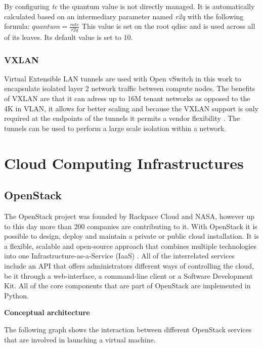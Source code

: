 By configuring \textit{tc} the quantum value is not directly managed. It is automatically calculated based on an intermediary parameter named \textit{r2q} with the following formula:  $ quantum = \frac{rate}{r2q} $ This value is set on the root qdisc and is used across all of its leaves. Its default value is set to 10.


\subsubsection{VXLAN}

Virtual Extensible LAN tunnels are used with Open vSwitch in this work to encapsulate isolated layer 2 network traffic between compute nodes. The benefits of VXLAN are that it can adress up to 16M tenant networks as opposed to the 4K in VLAN, it allows for better scaling and because the VXLAN support is only required at the endpoints of the tunnels it permits a vendor flexibility \cite{openstack-vxlan}. The tunnels can be used to perform a large scale isolation within a network.

\newpage
\section{Cloud Computing Infrastructures}


\subsection{OpenStack}

The OpenStack project was founded by Rackpace Cloud and NASA, however up to this day  more than 200 companies are contributing to it.
With OpenStack it is possible to design, deploy and maintain a private or public cloud installation. It is a flexible, scalable and open-source approach that combines multiple technologies into one Infrastructure-as-a-Service (IaaS) \cite{openstack-ops}. All of the interrelated services include an API that offers administrators different ways of controlling the cloud, be it through a web-interface, a command-line client or a Software Development Kit. All of the core components that are part of OpenStack are implemented in Python.


\textbf{Conceptual architecture}

The following graph shows the interaction between different OpenStack services that are involved in launching a virtual machine.

